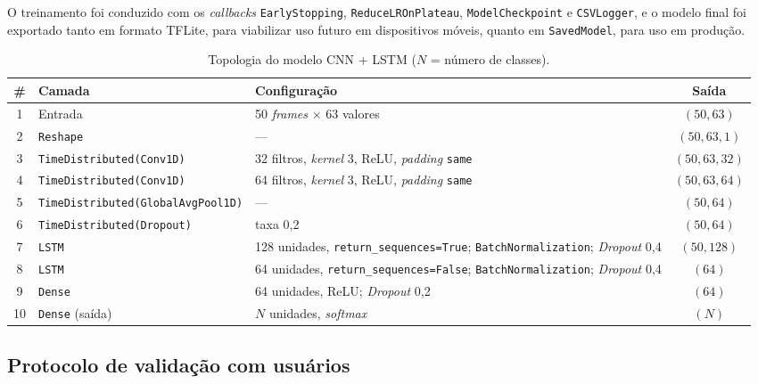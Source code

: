 O treinamento foi conduzido com os \textit{callbacks} \texttt{EarlyStopping},
\texttt{ReduceLROnPlateau}, \texttt{ModelCheckpoint} e \texttt{CSVLogger}, e o
modelo final foi exportado tanto em formato TFLite, para viabilizar uso futuro em
dispositivos móveis, quanto em \texttt{SavedModel}, para uso em produção.


\begin{table}[htbp]
\centering
\caption{Topologia do modelo CNN + LSTM ($N$ = número de classes).}
\label{tab:topologia}
\small
\begin{tabular}{@{}c p{3.6cm} p{5.6cm} c@{}}
\toprule
\textbf{\#} & \textbf{Camada} & \textbf{Configuração} & \textbf{Saída} \\
\midrule
1 & Entrada & 50 \textit{frames} $\times$ 63 valores & $(50, 63)$ \\
2 & \texttt{Reshape} & — & $(50, 63, 1)$ \\
3 & \texttt{TimeDistributed(Conv1D)} & 32 filtros, \textit{kernel} 3, ReLU, \textit{padding} \texttt{same} & $(50, 63, 32)$ \\
4 & \texttt{TimeDistributed(Conv1D)} & 64 filtros, \textit{kernel} 3, ReLU, \textit{padding} \texttt{same} & $(50, 63, 64)$ \\
5 & \texttt{TimeDistributed(GlobalAvgPool1D)} & — & $(50, 64)$ \\
6 & \texttt{TimeDistributed(Dropout)} & taxa 0,2 & $(50, 64)$ \\
7 & \texttt{LSTM} & 128 unidades, \texttt{return\_sequences=True}; \texttt{BatchNormalization}; \textit{Dropout} 0,4 & $(50, 128)$ \\
8 & \texttt{LSTM} & 64 unidades, \texttt{return\_sequences=False}; \texttt{BatchNormalization}; \textit{Dropout} 0,4 & $(64)$ \\
9 & \texttt{Dense} & 64 unidades, ReLU; \textit{Dropout} 0,2 & $(64)$ \\
10 & \texttt{Dense} (saída) & $N$ unidades, \textit{softmax} & $(N)$ \\
\bottomrule
\end{tabular}
\end{table}

\subsection{Protocolo de validação com usuários}
\label{subsec:validacao}

